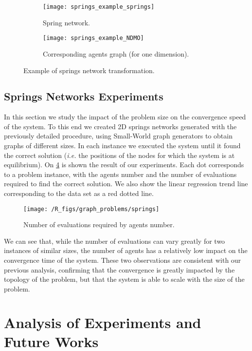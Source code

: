 \begin{figure}
\centering
\begin{subfigure}[b]{0.3\textwidth}
\texttt{[image: springs\_example\_springs]}
\caption{Spring network.}\label{springs_example:springs}
\end{subfigure}
\qquad
\begin{subfigure}[b]{0.45\textwidth}
\texttt{[image: springs\_example\_NDMO]}
\caption{Corresponding agents graph (for one dimension).}\label{springs_example:agents}
\end{subfigure}

\caption{Example of springs network transformation.}\label{springs_example}
\end{figure}

\subsection{Springs Networks Experiments}

In this section we study the impact of the problem size on the convergence speed of the system. To this end we created 2D springs networks generated with the previously detailed procedure, using Small-World graph generators to obtain graphs of different sizes. In each instance we executed the system until it found the correct solution (\emph{i.e.} the positions of the nodes for which the system is at equilibrium). On \figurename{} \ref{springs_res} is shown the result of our experiments. Each dot corresponds to a problem instance, with the agents number and the number of evaluations required to find the correct solution. We also show the linear regression trend line corresponding to the data set as a red dotted line.

\begin{figure}
\centering
\texttt{[image: /R\_figs/graph\_problems/springs]}
\caption{Number of evaluations required by agents number.}\label{springs_res}
\end{figure}

We can see that, while the number of evaluations can vary greatly for two instances of similar sizes, the number of agents has a relatively low impact on the convergence time of the system. These two observations are consistent with our previous analysis, confirming that the convergence is greatly impacted by the topology of the problem, but that the system is able to scale with the size of the problem.

\newpage
\section*{Analysis of Experiments and Future Works}

